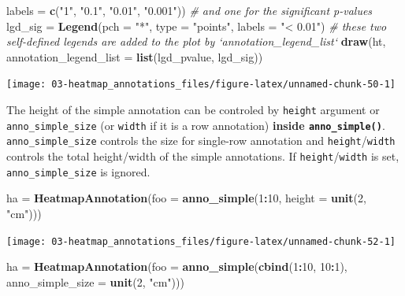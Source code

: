 \documentclass[]{book}
\newenvironment{Shaded}{\begin{snugshade}}{\end{snugshade}}
\newcommand{\KeywordTok}[1]{\textcolor[rgb]{0.13,0.29,0.53}{\textbf{#1}}}
\newcommand{\DataTypeTok}[1]{\textcolor[rgb]{0.13,0.29,0.53}{#1}}
\newcommand{\DecValTok}[1]{\textcolor[rgb]{0.00,0.00,0.81}{#1}}
\newcommand{\StringTok}[1]{\textcolor[rgb]{0.31,0.60,0.02}{#1}}
\newcommand{\CommentTok}[1]{\textcolor[rgb]{0.56,0.35,0.01}{\textit{#1}}}
\newcommand{\OperatorTok}[1]{\textcolor[rgb]{0.81,0.36,0.00}{\textbf{#1}}}
\newcommand{\NormalTok}[1]{#1}
\theoremstyle{definition}
\theoremstyle{definition}
\theoremstyle{definition}
\theoremstyle{remark}
\begin{document}
\begin{Shaded}
\begin{Highlighting}[]
    \DataTypeTok{labels =} \KeywordTok{c}\NormalTok{(}\StringTok{"1"}\NormalTok{, }\StringTok{"0.1"}\NormalTok{, }\StringTok{"0.01"}\NormalTok{, }\StringTok{"0.001"}\NormalTok{))}
\CommentTok{# and one for the significant p-values}
\NormalTok{lgd_sig =}\StringTok{ }\KeywordTok{Legend}\NormalTok{(}\DataTypeTok{pch =} \StringTok{"*"}\NormalTok{, }\DataTypeTok{type =} \StringTok{"points"}\NormalTok{, }\DataTypeTok{labels =} \StringTok{"< 0.01"}\NormalTok{)}
\CommentTok{# these two self-defined legends are added to the plot by `annotation_legend_list`}
\KeywordTok{draw}\NormalTok{(ht, }\DataTypeTok{annotation_legend_list =} \KeywordTok{list}\NormalTok{(lgd_pvalue, lgd_sig))}
\end{Highlighting}
\end{Shaded}

\begin{center}\texttt{[image: 03-heatmap\_annotations\_files/figure-latex/unnamed-chunk-50-1]} \end{center}

The height of the simple annotation can be controled by \texttt{height}
argument or \texttt{anno\_simple\_size} (or \texttt{width} if it is a
row annotation) \textbf{inside \texttt{anno\_simple()}}.
\texttt{anno\_simple\_size} controls the size for single-row annotation
and \texttt{height}/\texttt{width} controls the total height/width of
the simple annotations. If \texttt{height}/\texttt{width} is set,
\texttt{anno\_simple\_size} is ignored.

\begin{Shaded}
\begin{Highlighting}[]
\NormalTok{ha =}\StringTok{ }\KeywordTok{HeatmapAnnotation}\NormalTok{(}\DataTypeTok{foo =} \KeywordTok{anno_simple}\NormalTok{(}\DecValTok{1}\OperatorTok{:}\DecValTok{10}\NormalTok{, }\DataTypeTok{height =} \KeywordTok{unit}\NormalTok{(}\DecValTok{2}\NormalTok{, }\StringTok{"cm"}\NormalTok{)))}
\end{Highlighting}
\end{Shaded}

\begin{center}\texttt{[image: 03-heatmap\_annotations\_files/figure-latex/unnamed-chunk-52-1]} \end{center}

\begin{Shaded}
\begin{Highlighting}[]
\NormalTok{ha =}\StringTok{ }\KeywordTok{HeatmapAnnotation}\NormalTok{(}\DataTypeTok{foo =} \KeywordTok{anno_simple}\NormalTok{(}\KeywordTok{cbind}\NormalTok{(}\DecValTok{1}\OperatorTok{:}\DecValTok{10}\NormalTok{, }\DecValTok{10}\OperatorTok{:}\DecValTok{1}\NormalTok{), }\DataTypeTok{anno_simple_size =} \KeywordTok{unit}\NormalTok{(}\DecValTok{2}\NormalTok{, }\StringTok{"cm"}\NormalTok{)))}
\end{Highlighting}
\end{Shaded}
\end{document}
